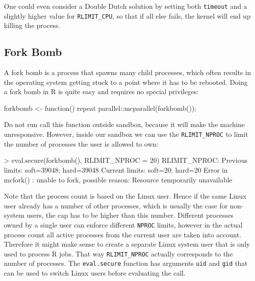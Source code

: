 \documentclass[article]{jss}
\begin{document}
\begin{appendices}
One could even consider a Double Dutch solution by setting both \texttt{timeout}
and a slightly higher value for \texttt{RLIMIT\_CPU}, so that if all else fails,
the kernel will end up killing the process.

\subsection{Fork Bomb}

A fork bomb is a process that spawns many child processes, which often results
in the operating system getting stuck to a point where it has to be rebooted.
Doing a fork bomb in R is quite easy and requires no special privileges:
\begin{CodeChunk}
\begin{CodeInput}
forkbomb <- function(){
  repeat{
    parallel::mcparallel(forkbomb());
  }
}
\end{CodeInput}
\end{CodeChunk}
Do not run call this function outside sandbox, because it will make the machine
unresponsive. However, inside our sandbox we can use the \texttt{RLIMIT\_NPROC}
to limit the number of processes the user is allowed to own:
\begin{CodeChunk}
\begin{CodeInput}
> eval.secure(forkbomb(), RLIMIT_NPROC = 20)
RLIMIT_NPROC:
Previous limits: soft=39048; hard=39048
Current limits: soft=20; hard=20
Error in mcfork() : 
  unable to fork, possible reason: Resource temporarily unavailable
\end{CodeInput}
\end{CodeChunk}
Note that the process count is based on the Linux user. Hence if the same Linux
user already has a number of other processes, which is usually the case for
non-system users, the cap has to be higher than this number. Different
processes owned by a single user can enforce different \texttt{NPROC} limits,
however in the actual process count all active processes from the current user
are taken into account. Therefore it might make sense to create a separate
Linux system user that is only used to process R jobs. That way \texttt{RLIMIT\_NPROC} actually
corresponds to the number of  processes. The \texttt{eval.secure}
function has arguments \texttt{uid} and \texttt{gid} that can be used to switch
Linux users before evaluating the call.


\end{appendices}

\newpage


\end{document}
